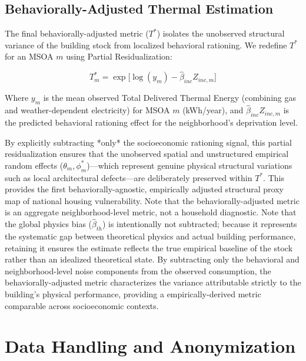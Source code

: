 \documentclass[11pt, a4paper, twocolumn]{article}
\begin{document}
\subsection{Behaviorally-Adjusted Thermal Estimation}\label{behaviorally-adjusted-thermal-estimation}

The final behaviorally-adjusted metric (\(T^*\)) isolates the unobserved structural variance of the building stock from localized behavioral rationing. We redefine \(T^*\) for an MSOA \(m\) using Partial Residualization:

\begin{equation}
T^*_{m} = \exp \bigl[ \log(y_{m}) - \hat{\beta}_{inc} Z_{inc, m} \bigr]
\end{equation}

Where \(y_{m}\) is the mean observed Total Delivered Thermal Energy (combining gas and weather-dependent electricity) for MSOA \(m\) (kWh/year), and \(\hat{\beta}_{inc} Z_{inc, m}\) is the predicted behavioral rationing effect for the neighborhood's deprivation level. 

By explicitly subtracting *only* the socioeconomic rationing signal, this partial residualization ensures that the unobserved spatial and unstructured empirical random effects ($\theta_m, \phi^*_m$)—which represent genuine physical structural variations such as local architectural defects—are deliberately preserved within $T^*$. This provides the first behaviorally-agnostic, empirically adjusted structural proxy map of national housing vulnerability. Note that the behaviorally-adjusted metric is an aggregate neighborhood-level metric, not a household diagnostic.
 Note that the global physics bias 
(\(\hat{\beta}_{th}\)) is intentionally not subtracted; because it 
represents the systematic gap between theoretical physics and actual 
building performance, retaining it ensures the estimate reflects the true 
empirical baseline of the stock rather than an idealized theoretical 
state. By subtracting only the behavioral and neighborhood-level noise 
components from the observed consumption, the behaviorally-adjusted metric characterizes the variance 
attributable strictly to the building's physical performance, providing 
a empirically-derived metric comparable across socioeconomic contexts.

\section{Data Handling and Anonymization}\label{data-handling}
\end{document}
